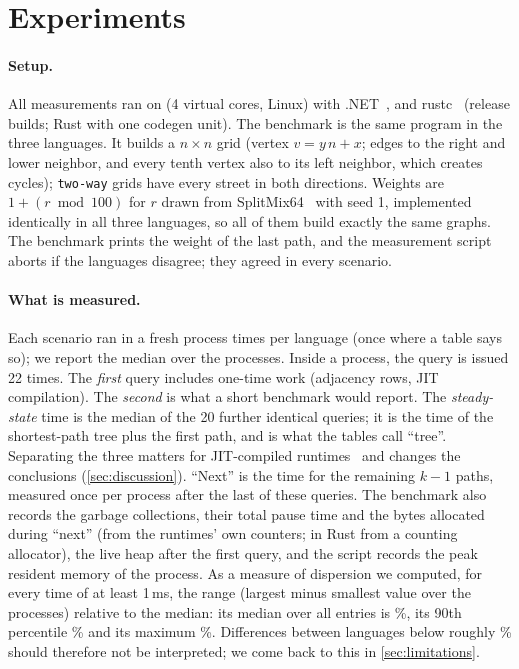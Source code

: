 \documentclass[11pt,a4paper]{article}
\begin{document}
\section{Experiments}\label{sec:experiments}

\paragraph{Setup.} All measurements ran on \NumCpu{} (4 virtual cores, Linux) with .NET~\NumDotnet, \NumGo{} and
rustc~\NumRustc{} (release builds; Rust with one codegen unit). The benchmark is the same program in the three
languages. It builds a $n\times n$ grid (vertex $v=y\,n+x$; edges to the right and lower neighbor, and every tenth
vertex also to its left neighbor, which creates cycles); \texttt{two-way} grids have every street in both directions.
Weights are $1+(r \bmod 100)$ for $r$ drawn from SplitMix64~\cite{steele2014} with seed 1, implemented identically
in all three languages, so all of them build exactly the same graphs. The benchmark prints the weight of the last
path, and the measurement script aborts if the languages disagree; they agreed in every scenario.

\paragraph{What is measured.} Each scenario ran in a fresh process \NumRepeat{} times per language (once where a
table says so); we report the median over the processes. Inside a process, the query is issued 22 times. The
\emph{first} query includes one-time work (adjacency rows, JIT compilation). The \emph{second} is what a short
benchmark would report. The \emph{steady-state} time is the median of the 20 further identical queries; it is the
time of the shortest-path tree plus the first path, and is what the tables call ``tree''. Separating the
three matters for JIT-compiled runtimes~\cite{georges2007,barrett2017} and changes the conclusions
(\cref{sec:discussion}). ``Next'' is the time for the remaining $k-1$ paths, measured once per process after the
last of these queries. The benchmark also records the garbage collections, their total pause time and the bytes
allocated during ``next'' (from the runtimes' own counters; in Rust from a counting allocator), the live heap after
the first query, and the script records the peak resident memory of the process. As a measure of dispersion we
computed, for every time of at least 1\,ms, the range (largest minus smallest value over the \NumRepeat{}
processes) relative to the median: its median over all entries is \NumSpreadMedian\%, its 90th percentile
\NumSpreadNinety\% and its maximum \NumSpreadMax\%. Differences between languages below roughly
\NumSpreadNinety\% should therefore not be interpreted; we come back to this in \cref{sec:limitations}.
\end{document}
